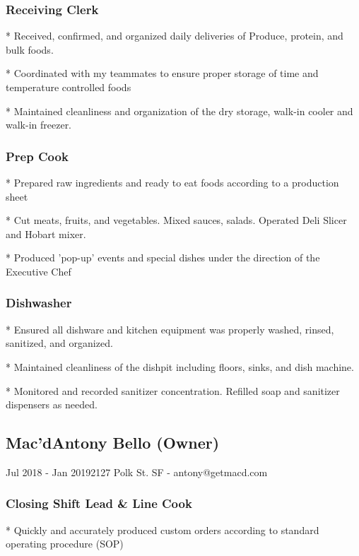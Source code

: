 \documentclass{article}
\begin{document}
\subsubsection{Receiving Clerk} 

* Received, confirmed, and organized daily deliveries of Produce, protein, and bulk foods.

* Coordinated with my teammates to ensure proper storage of time and temperature controlled foods

* Maintained cleanliness and organization of the dry storage, walk-in cooler and walk-in freezer.

\subsubsection{Prep Cook}

* Prepared raw ingredients and ready to eat foods according to a production sheet

* Cut meats, fruits, and vegetables. Mixed sauces, salads. Operated Deli Slicer and Hobart mixer.

* Produced 'pop-up' events and special dishes under the direction of the Executive Chef

\subsubsection{Dishwasher}

* Ensured all dishware and kitchen equipment was properly washed, rinsed, sanitized, and organized.

* Maintained cleanliness of the dishpit including floors, sinks, and dish machine.

* Monitored and recorded sanitizer concentration. Refilled soap and sanitizer dispensers as needed.

\subsection{Mac'd\hfill Antony Bello (Owner)}
\hspace{-.33in}Jul 2018 - Jan 2019\hfill 2127 Polk St. SF - antony@getmacd.com

\subsubsection{Closing Shift Lead \& Line Cook}

* Quickly and accurately produced custom orders according to standard operating procedure (SOP)
\end{document}
